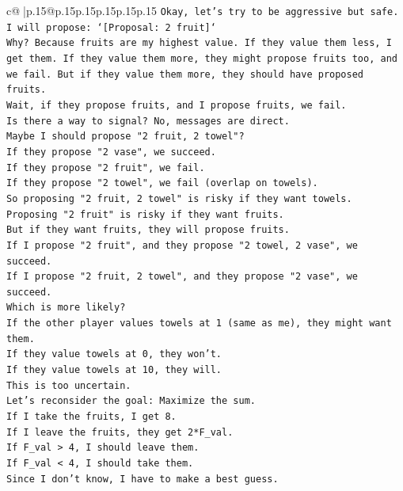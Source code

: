 \documentclass{article}
\begin{document}
{\begin{supertabular}{c@{$\;$}|p{.15\linewidth}@{}p{.15\linewidth}p{.15\linewidth}p{.15\linewidth}p{.15\linewidth}p{.15\linewidth}}
{{{\texttt{Okay, let's try to be aggressive but safe.} \\
\texttt{I will propose: `{[}Proposal: 2 fruit{]}`} \\
\texttt{Why? Because fruits are my highest value. If they value them less, I get them. If they value them more, they might propose fruits too, and we fail. But if they value them more, they should have proposed fruits.} \\
\texttt{Wait, if they propose fruits, and I propose fruits, we fail.} \\
\texttt{Is there a way to signal? No, messages are direct.} \\
\texttt{Maybe I should propose "2 fruit, 2 towel"?} \\
\texttt{If they propose "2 vase", we succeed.} \\
\texttt{If they propose "2 fruit", we fail.} \\
\texttt{If they propose "2 towel", we fail (overlap on towels).} \\
\texttt{So proposing "2 fruit, 2 towel" is risky if they want towels.} \\
\texttt{Proposing "2 fruit" is risky if they want fruits.} \\
\texttt{But if they want fruits, they will propose fruits.} \\
\texttt{If I propose "2 fruit", and they propose "2 towel, 2 vase", we succeed.} \\
\texttt{If I propose "2 fruit, 2 towel", and they propose "2 vase", we succeed.} \\
\texttt{Which is more likely?} \\
\texttt{If the other player values towels at 1 (same as me), they might want them.} \\
\texttt{If they value towels at 0, they won't.} \\
\texttt{If they value towels at 10, they will.} \\
\texttt{This is too uncertain.} \\
\texttt{Let's reconsider the goal: Maximize the sum.} \\
\texttt{If I take the fruits, I get 8.} \\
\texttt{If I leave the fruits, they get 2*F\_val.} \\
\texttt{If F\_val > 4, I should leave them.} \\
\texttt{If F\_val < 4, I should take them.} \\
\texttt{Since I don't know, I have to make a best guess.} \\
}}}
\end{supertabular}}
\end{document}
